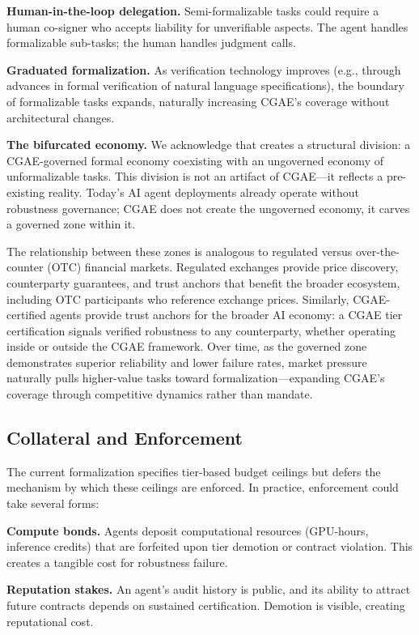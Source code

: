 \documentclass[11pt,a4paper]{article}
\begin{document}
\textbf{Human-in-the-loop delegation.} Semi-formalizable tasks could require a human co-signer who accepts liability for unverifiable aspects. The agent handles formalizable sub-tasks; the human handles judgment calls.

\textbf{Graduated formalization.} As verification technology improves (e.g., through advances in formal verification of natural language specifications), the boundary of formalizable tasks expands, naturally increasing CGAE's coverage without architectural changes.

\textbf{The bifurcated economy.} We acknowledge that  creates a structural division: a CGAE-governed formal economy coexisting with an ungoverned economy of unformalizable tasks. This division is not an artifact of CGAE---it reflects a pre-existing reality. Today's AI agent deployments already operate without robustness governance; CGAE does not create the ungoverned economy, it carves a governed zone within it.

The relationship between these zones is analogous to regulated versus over-the-counter (OTC) financial markets. Regulated exchanges provide price discovery, counterparty guarantees, and trust anchors that benefit the broader ecosystem, including OTC participants who reference exchange prices. Similarly, CGAE-certified agents provide trust anchors for the broader AI economy: a CGAE tier certification signals verified robustness to any counterparty, whether operating inside or outside the CGAE framework. Over time, as the governed zone demonstrates superior reliability and lower failure rates, market pressure naturally pulls higher-value tasks toward formalization---expanding CGAE's coverage through competitive dynamics rather than mandate.

\subsection{Collateral and Enforcement}

The current formalization specifies tier-based budget ceilings but defers the mechanism by which these ceilings are enforced. In practice, enforcement could take several forms:

\textbf{Compute bonds.} Agents deposit computational resources (GPU-hours, inference credits) that are forfeited upon tier demotion or contract violation. This creates a tangible cost for robustness failure.

\textbf{Reputation stakes.} An agent's audit history is public, and its ability to attract future contracts depends on sustained certification. Demotion is visible, creating reputational cost.
\end{document}
